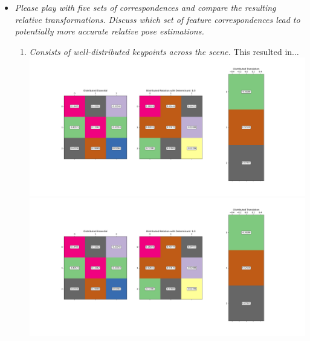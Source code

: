 \documentclass[11pt]{article}
\begin{document}
\begin{itemize}
        \item \textit{Please play with five sets of correspondences and compare the resulting relative
        transformations. Discuss which set of feature correspondences lead to potentially more accurate relative pose
        estimations.}\newline
        \begin{enumerate}
            \item \textit{Consists of well-distributed keypoints across the scene.}\newline
            This resulted in$\ldots$\newline
            \includegraphics[width=\textwidth]{Output Pictures/Distributed Lines}\newline
            \includegraphics[width=\textwidth]{Output Pictures/Distributed Matrices}\newline


\end{enumerate}
\end{itemize}
\end{document}
